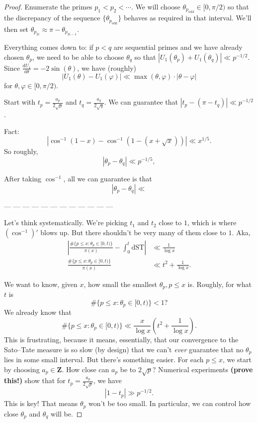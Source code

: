 \documentclass{article}
\newcommand{\bZ}{\mathbf{Z}}
\newcommand{\dd}{\mathrm{d}}
\newcommand{\odd}{\mathrm{odd}}
\newcommand{\ST}{\mathrm{ST}}
\begin{document}
\begin{proof}
Enumerate the primes $p_1 < p_2 < \cdots$. We will choose 
$\theta_{p_\odd}\in [0,\pi/2)$ so that the discrepancy of the sequence 
$\{\theta_{p_\odd}\}$ behaves as required in that interval. We'll then set 
$\theta_{p_{2i}}\approx \pi - \theta_{p_{2i-1}}$. 

Everything comes down to: if $p < q$ are sequential primes and we 
have already chosen $\theta_p$, we need to be able to choose $\theta_q$ so that 
$|U_1(\theta_p)+U_1(\theta_q)| \ll p^{-1/2}$. Since 
$\frac{\dd U_1}{\dd \theta} = -2\sin(\theta)$, we have (roughly)
\[
	|U_1(\theta)-U_1(\varphi)| \ll \max(\theta,\varphi) \cdot |\theta-\varphi| 
\]
for $\theta,\varphi\in [0,\pi/2)$. 

Start with $t_p = \frac{a_p}{2\sqrt p}$ and $t_q = \frac{a_q}{2\sqrt q}$. We 
can guarantee that $|t_p - (\pi-t_q)| \ll p^{-1/2}$. 

Fact: 
\[
	| \cos^{-1}(1-x) - \cos^{-1}(1-(x+\sqrt x))| \ll x^{1/5} .
\]
So roughly, 
\[
	|\theta_p - \theta_q| \ll p^{-1/5} ,
\]

After taking $\cos^{-1}$, 
all we can guarantee is that 
\[
	|\theta_p - \theta_q| \ll 
\]


--- --- --- --- --- --- --- --- --- --- --- --- 

Let's think systematically. We're picking $t_1$ and $t_2$ close to 
$1$, which is where $(\cos^{-1})'$ blows up. But there shouldn't be very many 
of them close to $1$. Aka, 
\begin{align*}
	\left|\frac{\#\{p \leqslant x : \theta_p \in [0,t)\}}{\pi(x)} - \int_0^t \dd\ST\right| 
		&\ll \frac{1}{\log x} \\ 
	\frac{\#\{p \leqslant x : \theta_p \in [0,t)\}}{\pi(x)} 
		&\ll t^2 + 	\frac{1}{\log x} .
\end{align*}

We want to know, given $x$, how small the smallest $\theta_p, p\leqslant x$ is. 
Roughly, for what $t$ is 
\[
	\# \{p \leqslant x: \theta_p\in [0,t)\} < 1? 
\]
We already know that 
\[
	\# \{p \leqslant x : \theta_p\in [0,t)\} \ll \frac{x}{\log x} \left( t^2 + \frac{1}{\log x}\right) .
\]
This is frustrating, because it means, essentially, that our convergence to 
the Sato--Tate measure is so slow (by design) that we can't \emph{ever} 
guarantee that no $\theta_p$ lies in some small interval. But there's 
something easier. For each $p\leqslant x$, we start by choosing 
$a_p\in \bZ$. How close can $a_p$ be to $2\sqrt p$? Numerical experiments 
\textbf{(prove this!)} show that for $t_p = \frac{a_p}{2\sqrt p}$, we have 
\[
	|1-t_p| \gg p^{-1/2} .
\]
This is key! That means $\theta_p$ won't be too small. In particular, we 
can control how close $\theta_p$ and $\theta_q$ will be. 


\end{proof}
\end{document}
